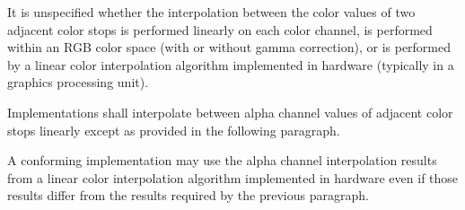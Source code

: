 \pnum
It is unspecified whether the interpolation between the color values of two adjacent color stops is performed linearly on each color channel, is performed within an RGB color space (with or without gamma correction), or is performed by a linear color interpolation algorithm implemented in hardware (typically in a graphics processing unit).

\pnum
Implementations shall interpolate between alpha channel values of adjacent color stops linearly except as provided in the following paragraph.

\pnum
A conforming implementation may use the alpha channel interpolation results from a linear color interpolation algorithm implemented in hardware even if those results differ from the results required by the previous paragraph.
